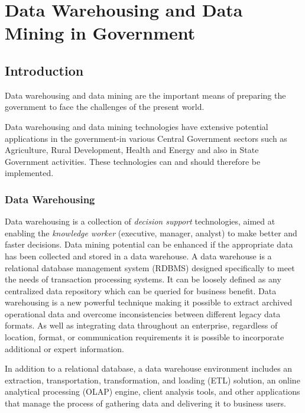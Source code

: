 \chapter{Data Warehousing and Data Mining in Government}

\section{Introduction}
Data warehousing and data mining are the important means of preparing the
government to face the challenges of the present world.

Data warehousing and data mining technologies have extensive potential
applications in the government-in various Central Government sectors such as
Agriculture, Rural Development, Health and Energy and also in State
Government activities. These technologies can and should therefore be
implemented.

\subsection*{Data Warehousing}

Data warehousing is a collection of \textit{decision support} technologies, aimed at enabling the \textit{knowledge worker} (executive, manager, analyst) to make better and faster decisions. Data mining potential can be enhanced if the appropriate data has been collected and stored in a data warehouse. A data
warehouse is a relational database management system (RDBMS) designed specifically to meet the
needs of transaction processing systems. It can be loosely defined as any centralized data repository
which can be queried for business benefit. Data warehousing
is a new powerful technique making it possible to extract archived operational data and overcome
inconsistencies between different legacy data formats. As well as integrating data throughout an
enterprise, regardless of location, format, or communication requirements it is possible to incorporate
additional or expert information.

In addition to a relational database, a data warehouse environment includes an extraction,
transportation, transformation, and loading (ETL) solution, an online analytical processing (OLAP)
engine, client analysis tools, and other applications that manage the process of gathering data and
delivering it to business users.

